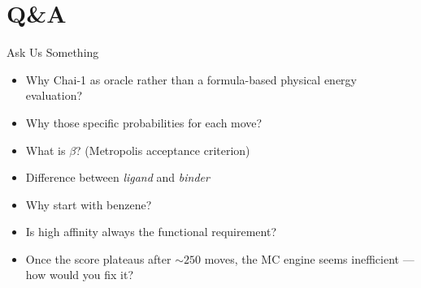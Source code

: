 \documentclass{beamer}
\begin{document}
\section*{Q\&A}

\begin{frame}{Ask Us Something}
  \begin{itemize}
    \item Why Chai-1 as oracle rather than a formula-based physical energy evaluation?
    \item Why those specific probabilities for each move?
    \item What is $\beta$? (Metropolis acceptance criterion)
    \item Difference between \textit{ligand} and \textit{binder}
    \item Why start with benzene?
    \item Is high affinity always the functional requirement?
    \item Once the score plateaus after ${\sim}250$ moves, the MC engine seems inefficient --- how would you fix it?
  \end{itemize}
\end{frame}
\end{document}
